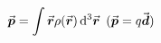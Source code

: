 

\vspace*{\fill}
\centering

\begin{align*}
    \va*{p} = \int \va*{r} \rho(\va*{r}) \dd[3]{\va*{r}} ~(\va*{p} = q\va*{d})
\end{align*}

\centering
\vspace*{\fill}

